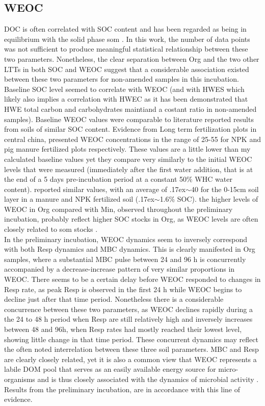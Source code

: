 	\subsection{WEOC}
	DOC is often correlated with SOC content and has been regarded as being in equilibrium with the solid phase \gls{som} \citep{malik2013}. In this work, the number of data points was not sufficient to produce meaningful statistical relationship between these two parameters. Nonetheless, the clear separation between Org and the two other LTTs in both SOC and WEOC suggest that a considerable association existed between these two parameters for non-amended samples in this incubation. Baseline SOC level seemed to correlate with WEOC (and with HWES which likely also implies a correlation with HWEC as it has been demonstrated that HWE total carbon and carbohydrates maintiand a costant ratio in non-amended samples).
	Baseline WEOC values were comparable to literature reported results from soils of similar SOC content. Evidence from Long term fertilization plots in central china, presented WEOC concentrations in the range of 25-55 \genericunit for NPK and pig manure fertilized plots respectively\citep{xu2018}. These values are a little lower than my calculated baseline values yet they compare very similarly to the initial WEOC levels that were measured (immediately after the first water addition, that is  at the end of a 5 days pre-incubation period at a constant 50\% WHC water content). \citet{hamkalo2014} reported similar values, with an average of {\raise.17ex\hbox{$\scriptstyle\mathtt{\sim}$}}40 \genericunit for the 0-15cm  soil layer in a manure and NPK fertilized soil ({\raise.17ex\hbox{$\scriptstyle\mathtt{\sim}$}}1.6\% SOC).
	the higher levels of WEOC in Org compared with Min, observed throughout the preliminary incubation, probably reflect higher SOC stocks in Org, as WEOC levels are often closely related to \gls{som} stocks\citep{malik2013} .\\
	In the preliminary incubation, WEOC dynamics seem to inversely correspond with both Resp dynamics and MBC dynamics. This is clearly manifested in Org samples, where a substantial MBC pulse between 24 and 96 h is concurrently accompanied by a decrease-increase pattern of very similar proportions in WEOC. There seems to be a certain delay before WEOC responded to changes in Resp rate, as peak Resp is observed in the first 24 h while WEOC begins to decline just after that time period. Nonetheless there is a considerable concurrence between these two parameters, as WEOC declines rapidly during a the 24 to 48 h period when Resp are still relatively high and inversely increases between 48 and 96h, when Resp rates had mostly reached their lowest level, showing little change in that time period. These concurrent dynamics may reflect the often noted interrelation between these three soil parameters. MBC and Resp are clearly closely related, yet it is also a common view that WEOC represents a labile DOM pool that serves as an easily available energy source for micro-organisms and is thus closely associated with the dynamics of microbial activity \citep{kemmitt2008, kaiser2012, guggenberger1998}. Results from the preliminary incubation, are in accordance with this line of evidence.\\


